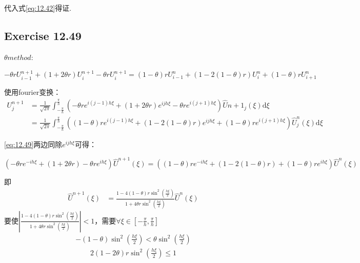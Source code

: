 \documentclass[UTF8]{ctexart}
\newcommand{\dif}{\mathrm{d}}
\begin{document}
代入式\eqref{eq:12.42}得证.

\subsection*{Exercise 12.49}
$\theta method :$

$-\theta rU^{n+1}_{i-1} + (1+2\theta r)U_i^{n+1} - \theta rU^{n+1}_{i} = (1-\theta)rU^n_{i-1} + (1 - 2(1-\theta)r)U^n_i + (1-\theta)rU^n_{i+1}$

使用fourier变换：
\begin{equation}
    \label{eq:12.49}
    \begin{aligned}
        U_j^{n+1} &= \frac{1}{\sqrt{2\pi}}\int_{-\frac{\pi}{h}}^{\frac{\pi}{h}} 
        (-\theta re^{i(j-1)h\xi} + (1+2\theta r)e^{ijh\xi} - \theta re^{i(j+1)h\xi} )\hat{U}{n+1}_j(\xi) \dif\xi \\
        &= \frac{1}{\sqrt{2\pi}}\int_{-\frac{\pi}{h}}^{\frac{\pi}{h}}
        ((1-\theta)re^{i(j-1)h\xi} + (1 - 2(1-\theta)r)e^{ijh\xi} + (1-\theta)re^{i(j+1)h\xi} )\hat{U}^{n}_j(\xi) \dif\xi 
    \end{aligned}
\end{equation}

\eqref{eq:12.49}两边同除$e^{ijh\xi}$可得： 

$(-\theta re^{-ih\xi} + (1+2\theta r) - \theta re^{ih\xi})\hat{U}^{n+1}(\xi) = ((1-\theta)re^{-ih\xi} + (1 - 2(1-\theta)r) + (1-\theta)re^{ih\xi})\hat{U}^{n}(\xi)$

即
\begin{equation}
    \label{eq:12.49-2}
    \begin{aligned}
        \hat{U}^{n+1}(\xi) &= \frac{1-4(1-\theta)r\sin^2(\frac{h\xi}{2})}{1+4\theta r\sin^2(\frac{h\xi}{2})}\hat{U}^{n}(\xi) 
    \end{aligned}
\end{equation}
要使$|\frac{1-4(1-\theta)r\sin^2(\frac{h\xi}{2})}{1+4\theta r\sin^2(\frac{h\xi}{2})}| < 1$，需要$\forall\xi\in[-\frac{\pi}{h}, \frac{\pi}{h}]$
\begin{equation}
    \label{eq:12.49-3}
    \begin{aligned}
        -(1-\theta)\sin^2(\frac{h\xi}{2}) < \theta \sin^2(\frac{h\xi}{2})
    \end{aligned}
\end{equation}
\begin{equation}
    \label{eq:12.49-4}
    \begin{aligned}
        2(1-2\theta)r\sin^2(\frac{h\xi}{2}) \leq 1
    \end{aligned}
\end{equation}
\end{document}
